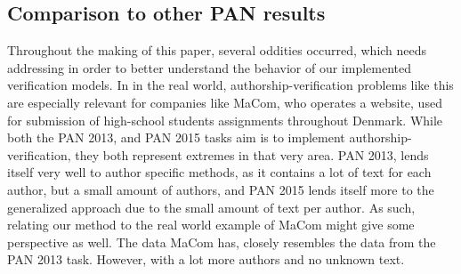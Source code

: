 
\subsection{Comparison to other PAN results}

Throughout the making of this paper, several oddities occurred, which needs
addressing in order to better understand the behavior of our implemented
verification models. In in the real world, authorship-verification problems
like this are especially relevant for companies like MaCom, who operates a
website, used for submission of high-school students assignments throughout
Denmark. While both the PAN 2013, and PAN 2015 tasks aim is to implement
authorship-verification, they both represent extremes in that very area. PAN
2013, lends itself very well to author specific methods, as it contains a lot of
text for each author, but a small amount of authors, and PAN 2015 lends itself
more to the generalized approach due to the small amount of text per author. As
such, relating our method to the real world example of MaCom might give some
perspective as well. The data MaCom has, closely resembles the data from the PAN
2013 task. However, with a lot more authors and no unknown text.

